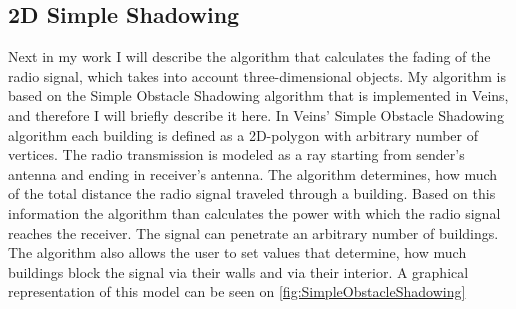 \documentclass[]{nsm-thesis}
\begin{document}
\subsection{2D Simple Shadowing}

Next in my work I will describe the algorithm that calculates the fading of the radio signal, which takes into account three-dimensional objects. My algorithm is based on the Simple Obstacle Shadowing algorithm \cite{SimpleObstacleShadowing} that is implemented in Veins, and therefore I will briefly describe it here. In Veins' Simple Obstacle Shadowing algorithm each building is defined as a 2D-polygon with arbitrary number of vertices. The radio transmission is modeled as a ray starting from sender's antenna and ending in receiver's antenna. The algorithm determines, how much of the total distance the radio signal traveled through a building. Based on this information the algorithm than calculates the power with which the radio signal reaches the receiver. The signal can penetrate an arbitrary number of buildings. The algorithm also allows the user to set values that determine, how much buildings block the signal via their walls and via their interior. A graphical representation of this model can be seen on \cref{fig:SimpleObstacleShadowing}
\end{document}
